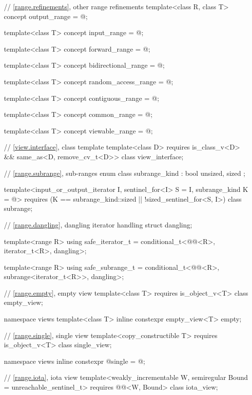 \documentclass{wg21}
\begin{document}
\begin{codeblock}
{	// \ref{range.refinements}, other range refinements
	template<class R, class T>
	concept output_range = @\seebelow@;

	template<class T>
	concept input_range = @\seebelow@;

	template<class T>
	concept forward_range = @\seebelow@;

	template<class T>
	concept bidirectional_range = @\seebelow@;

	template<class T>
	concept random_access_range = @\seebelow@;

	template<class T>
	concept contiguous_range = @\seebelow@;

	template<class T>
	concept common_range = @\seebelow@;

	template<class T>
	concept viewable_range = @\seebelow@;

	// \ref{view.interface}, class template 
	template<class D>
	requires is_class_v<D> && same_as<D, remove_cv_t<D>>
	class view_interface;

	// \ref{range.subrange}, sub-ranges
	enum class subrange_kind : bool { unsized, sized };

	template<input_or_output_iterator I, sentinel_for<I> S = I, subrange_kind K = @\seebelow@>
	requires (K == subrange_kind::sized || !sized_sentinel_for<S, I>)
	class subrange;

	// \ref{range.dangling}, dangling iterator handling
	struct dangling;

	template<range R>
	using safe_iterator_t = conditional_t<@@<R>, iterator_t<R>, dangling>;

	template<range R>
	using safe_subrange_t =
	conditional_t<@@<R>, subrange<iterator_t<R>>, dangling>;

	// \ref{range.empty}, empty view
	template<class T>
	requires is_object_v<T>
	class empty_view;

	namespace views {
		template<class T>
		inline constexpr empty_view<T> empty{};
	}

	// \ref{range.single}, single view
	template<copy_constructible T>
	requires is_object_v<T>
	class single_view;

	namespace views { inline constexpr @\unspec@ single = @\unspec@; }

	// \ref{range.iota}, iota view
	template<weakly_incrementable W, semiregular Bound = unreachable_sentinel_t>
	requires @@<W, Bound>
	class iota_view;

}
\end{codeblock}
\end{document}
